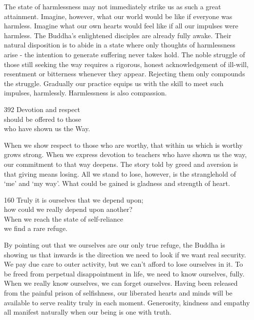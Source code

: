 \begin{dhpRefl}
The state of harmlessness may not immediately strike us as such a great attainment. Imagine, however, what our world would be like if everyone was harmless. Imagine what our own hearts would feel like if all our impulses were harmless. The Buddha's enlightened disciples are already fully awake. Their natural disposition is to abide in a state where only thoughts of harmlessness arise - the intention to generate suffering never takes hold. The noble struggle of those still seeking the way requires a rigorous, honest acknowledgement of ill-will, resentment or bitterness whenever they appear. Rejecting them only compounds the struggle. Gradually our practice equips us with the skill to meet such impulses, harmlessly. Harmlessness is also compassion.
\end{dhpRefl}


\begin{dhpVerse}{392}
\label{dhp-392}
Devotion and respect\\
should be offered to those\\
who have shown us the Way.
\end{dhpVerse}

\begin{dhpRefl}
When we show respect to those who are worthy, that within us which is worthy grows strong. When we express devotion to teachers who have shown us the way, our commitment to that way deepens. The story told by greed and aversion is that giving means losing. All we stand to lose, however, is the stranglehold of `me' and `my way'. What could be gained is gladness and strength of heart.
\end{dhpRefl}


\begin{dhpVerse}{160}
\label{dhp-160}
Truly it is ourselves that we depend upon;\\
how could we really depend upon another?\\
When we reach the state of self-reliance\\
we find a rare refuge.
\end{dhpVerse}

\begin{dhpRefl}
By pointing out that we ourselves are our only true refuge, the Buddha is showing us that inwards is the direction we need to look if we want real security. We pay due care to outer activity, but we can't afford to lose ourselves in it. To be freed from perpetual disappointment in life, we need to know ourselves, fully. When we really know ourselves, we can forget ourselves. Having been released from the painful prison of selfishness, our liberated hearts and minds will be available to serve reality truly in each moment. Generosity, kindness and empathy all manifest naturally when our being is one with truth.
\end{dhpRefl}

